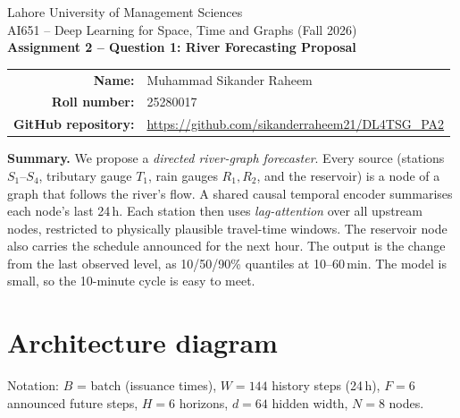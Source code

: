 \documentclass[11pt,a4paper]{article}
\begin{document}
\begin{center}
  {\large Lahore University of Management Sciences}\\[2pt]
  AI651 -- Deep Learning for Space, Time and Graphs \quad (Fall 2026)\\[8pt]
  {\LARGE\bfseries Assignment 2 -- Question 1: River Forecasting Proposal}\\[8pt]
  \begin{tabular}{rl}
    \textbf{Name:} & Muhammad Sikander Raheem \\
    \textbf{Roll number:} & 25280017 \\
    \textbf{GitHub repository:} & \url{https://github.com/sikanderraheem21/DL4TSG_PA2}
  \end{tabular}
\end{center}

\noindent\textbf{Summary.} We propose a \emph{directed river-graph forecaster}.
Every source (stations $S_1$--$S_4$, tributary gauge $T_1$, rain gauges
$R_1,R_2$, and the reservoir) is a node of a graph that follows the river's flow.
A shared causal temporal encoder summarises each node's last 24\,h. Each
station then uses \emph{lag-attention} over all upstream nodes, restricted to
physically plausible travel-time windows. The reservoir node also carries the
schedule announced for the next hour. The output is the change from the last
observed level, as 10/50/90\% quantiles at 10--60\,min. The model is small, so
the 10-minute cycle is easy to meet.

\section{Architecture diagram}
Notation: $B$ = batch (issuance times), $W=144$ history steps (24\,h), $F=6$
announced future steps, $H=6$ horizons, $d=64$ hidden width, $N=8$ nodes.
\end{document}
